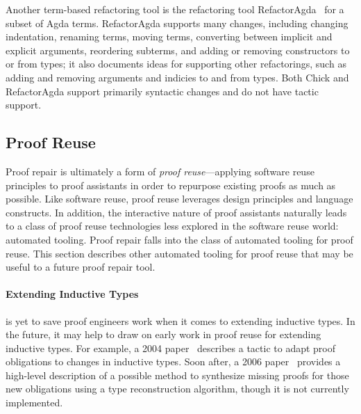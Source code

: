 Another term-based refactoring tool is the refactoring tool RefactorAgda~\cite{wibergh2019} for a subset of Agda terms.
RefactorAgda supports many changes, including changing indentation, renaming terms, moving terms, converting between implicit and
explicit arguments, reordering subterms, and adding or removing constructors to or from types; 
it also documents ideas for supporting other refactorings, such as adding and removing arguments and indicies to and from types.
Both Chick and RefactorAgda support primarily syntactic changes and do not have tactic support.

\subsection{Proof Reuse}
\label{sec:reuse}

Proof repair is ultimately a form of \textit{proof reuse}---applying software reuse principles to proof assistants
in order to repurpose existing proofs as much as possible.
Like software reuse, proof reuse leverages design principles and language constructs.
In addition, the interactive nature of proof assistants naturally leads to a class of proof reuse technologies less explored
in the software reuse world: automated tooling.
Proof repair falls into the class of automated tooling for proof reuse.
This section describes other automated tooling for proof reuse that may be useful to a future proof repair tool.

\paragraph{Extending Inductive Types} 
\toolnamec is yet to save proof engineers work when it comes to extending inductive types.
In the future, it may help to draw on early work in proof reuse for extending inductive types.
For example, a 2004 paper~\cite{Boite2004} describes a tactic to adapt proof obligations
to changes in inductive types.
Soon after, a 2006 paper~\cite{Mulhern06proofweaving} provides a high-level
description of a possible method to synthesize missing proofs for those new obligations using a type reconstruction algorithm,
though it is not currently implemented.

\iffalse
\paragraph{Proof Planning}
Proof repair tools may also benefit from work in \textit{proof planning}~\cite{Bundy1998}, a proof search technique
that uses plans to guide search for proofs with similar structures.
Proof planning can involve the use of \textit{critics}~\cite{ireland1996},
which reuse information from failing proofs to guide search for correct proofs.
While proof planning was originally designed for use with automated theorem provers, it has also reached
proof assistants.
For example, IsaPlanner~\citep{Dixon2003} is a proof planner for Isabelle with support
for rippling~\citep{shah2005}, a technique for automatic induction.
Rippling has also been implemented in an induction automation
tool for Coq~\citep{wilson2010}.
\fi

